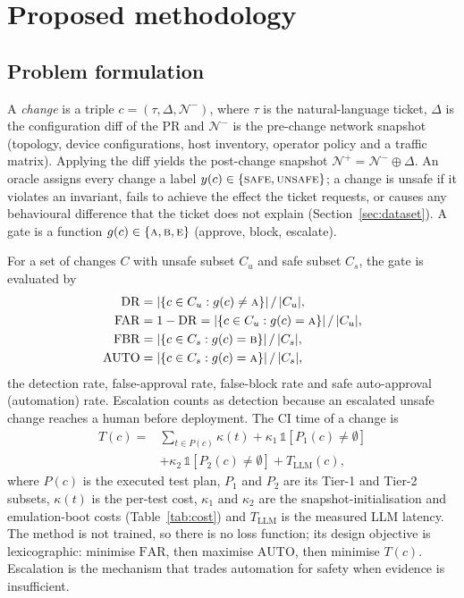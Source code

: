 \documentclass[pdflatex,iicol,sn-mathphys-num]{sn-jnl}%
\theoremstyle{thmstyletwo}%
\begin{document}
\section{Proposed methodology}\label{sec:method}

\subsection{Problem formulation}\label{sec:formulation}

A \emph{change} is a triple $c=(\tau,\Delta,\mathcal{N}^{-})$, where $\tau$ is the natural-language ticket, $\Delta$ is the configuration diff of the PR and $\mathcal{N}^{-}$ is the pre-change network snapshot (topology, device configurations, host inventory, operator policy and a traffic matrix). Applying the diff yields the post-change snapshot $\mathcal{N}^{+}=\mathcal{N}^{-}\oplus\Delta$. An oracle assigns every change a label $y(c)\in\{\textsc{safe},\textsc{unsafe}\}$; a change is unsafe if it violates an invariant, fails to achieve the effect the ticket requests, or causes any behavioural difference that the ticket does not explain (Section~\ref{sec:dataset}). A gate is a function $g(c)\in\{\textsc{a},\textsc{b},\textsc{e}\}$ (approve, block, escalate).

For a set of changes $C$ with unsafe subset $C_u$ and safe subset $C_s$, the gate is evaluated by
\begin{align}
\mathrm{DR} &= |\{c\in C_u : g(c)\neq\textsc{a}\}|\,/\,|C_u|,\label{eq:dr}\\
\mathrm{FAR} &= 1-\mathrm{DR} = |\{c\in C_u : g(c)=\textsc{a}\}|\,/\,|C_u|,\\
\mathrm{FBR} &= |\{c\in C_s : g(c)=\textsc{b}\}|\,/\,|C_s|,\\
\mathrm{AUTO} &= |\{c\in C_s : g(c)=\textsc{a}\}|\,/\,|C_s|,\label{eq:fbr}
\end{align}
the detection rate, false-approval rate, false-block rate and safe auto-approval (automation) rate. Escalation counts as detection because an escalated unsafe change reaches a human before deployment. The CI time of a change is
\begin{equation}
\begin{split}
T(c) ={}& \textstyle\sum_{t\in P(c)} \kappa(t) + \kappa_{1}\,\mathbb{1}[P_1(c)\neq\emptyset]\\
&+ \kappa_{2}\,\mathbb{1}[P_2(c)\neq\emptyset] + T_{\mathrm{LLM}}(c),
\end{split}\label{eq:time}
\end{equation}
where $P(c)$ is the executed test plan, $P_1$ and $P_2$ are its Tier-1 and Tier-2 subsets, $\kappa(t)$ is the per-test cost, $\kappa_1$ and $\kappa_2$ are the snapshot-initialisation and emulation-boot costs (Table~\ref{tab:cost}) and $T_{\mathrm{LLM}}$ is the measured LLM latency. The method is not trained, so there is no loss function; its design objective is lexicographic: minimise $\mathrm{FAR}$, then maximise $\mathrm{AUTO}$, then minimise $T(c)$. Escalation is the mechanism that trades automation for safety when evidence is insufficient.
\end{document}
